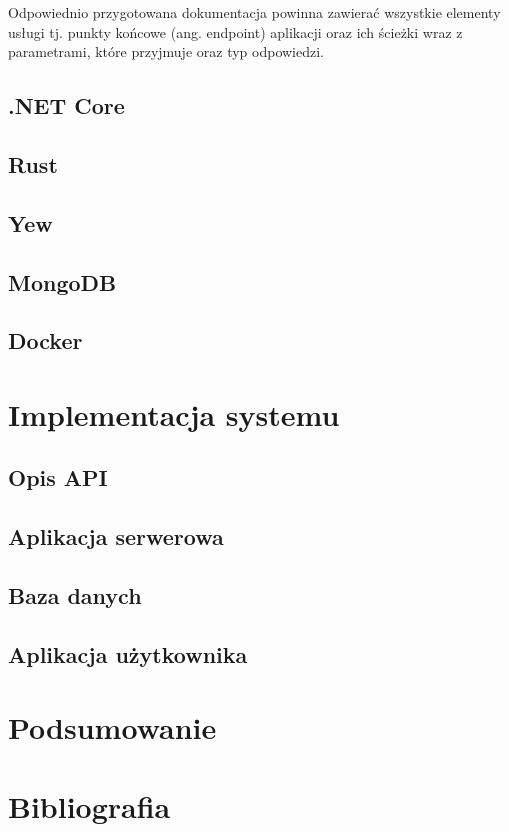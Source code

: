 \documentclass[12pt,a4paper]{article}
\begin{document}
Odpowiednio przygotowana dokumentacja powinna zawierać wszystkie elementy usługi tj.
punkty końcowe (ang. endpoint) aplikacji oraz ich ścieżki wraz z parametrami, które
przyjmuje oraz typ odpowiedzi.

\subsection{.NET Core}
\subsection{Rust}
\subsection{Yew}
\subsection{MongoDB}
\subsection{Docker}

\section{Implementacja systemu}
\subsection{Opis API}
\subsection{Aplikacja serwerowa}
\subsection{Baza danych}
\subsection{Aplikacja użytkownika}

\section{Podsumowanie}

\section{Bibliografia}
\end{document}
